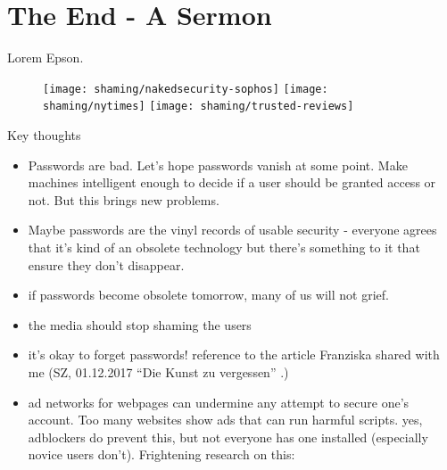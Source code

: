 
\chapter[The End - A Sermon]{The End - A Sermon}\label{chap:the_end}


Lorem Epson. 

\begin{figure}[htpb]
	\centering
	\texttt{[image: shaming/nakedsecurity-sophos]}
	\texttt{[image: shaming/nytimes]}
	\texttt{[image: shaming/trusted-reviews]}
\end{figure}

Key thoughts

\begin{itemize}
\item Passwords are bad. Let's hope passwords vanish at some point. Make machines intelligent enough to decide if a user should be granted access or not. But this brings new problems.
\item Maybe passwords are the vinyl records of usable security - everyone agrees that it's kind of an obsolete technology but there's something to it that ensure they don't disappear. %
 \item  if passwords become obsolete tomorrow, many of us will not grief. 
 \item  the media should stop shaming the users 
 \item  it's okay to forget passwords! reference to the article Franziska shared with me (SZ,  01.12.2017 ``Die Kunst zu vergessen'' .)
 \item 	ad networks for webpages can undermine any attempt to secure one's account. Too many websites show ads that can run harmful scripts. yes, adblockers do prevent this, but not everyone has one installed (especially novice users don't). Frightening research on this: 
\end{itemize}




